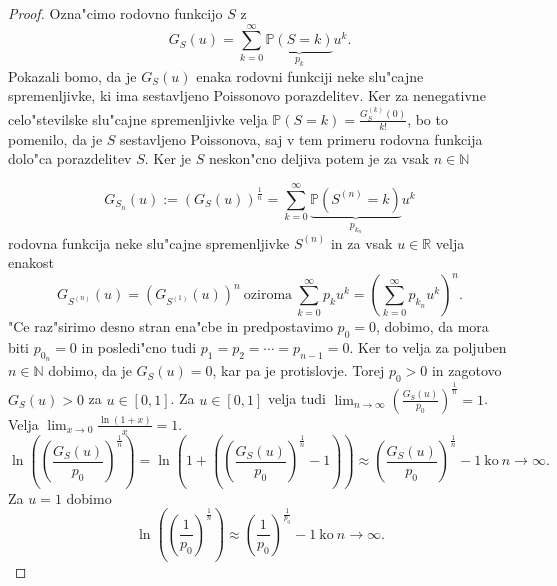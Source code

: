 \documentclass[12pt, a4paper, reqno]{amsart}
\theoremstyle{definition}
\theoremstyle{plain}
\newcommand{\R}{\mathbb{R}}
\newcommand{\N}{\mathbb{N}}
\newcommand{\Prob}{\mathbb{P}}
\newcommand{\1}{\mathds{1}}
\begin{document}
    \begin{proof}
        Ozna"cimo rodovno funkcijo $S$ z 
        \begin{equation*}
            G_S(u) = \sum_{k = 0}^\infty \underbrace{\Prob\left(S = k\right)}_{p_k}u^k.
        \end{equation*} 
        Pokazali bomo, da je $G_S(u)$ enaka rodovni funkciji neke slu"cajne spremenljivke, ki ima sestavljeno
        Poissonovo porazdelitev. Ker za nenegativne celo"stevilske slu"cajne spremenljivke velja 
        $\Prob\left(S = k\right) = \frac{G_S^{(k)}(0)}{k!}$, bo to pomenilo, da je $S$ sestavljeno Poissonova, 
        saj v tem primeru rodovna funkcija dolo"ca porazdelitev $S$.
        Ker je $S$ neskon"cno deljiva potem je za vsak $n\in\N$ 

        \begin{equation*}
            G_{S_n}(u) := \left(G_S(u)\right)^{\frac{1}{n}} = 
            \sum_{k = 0}^\infty\underbrace{\Prob\left(S^{(n)} = k\right)}_{p_{k_n}}u^k
        \end{equation*}
        rodovna funkcija neke slu"cajne spremenljivke $S^{(n)}$ in za vsak $u\in\R$ velja enakost
        \begin{equation*}
            G_{S^{(n)}}(u) = \left(G_{S^{(1)}}(u)\right)^n \ \text{oziroma} \ 
            \sum_{k = 0}^\infty p_{k}u^k = \left(\sum_{k = 0}^\infty p_{k_n}u^k\right)^n.
        \end{equation*}
        "Ce raz"sirimo desno stran ena"cbe in predpostavimo $p_0 = 0$, dobimo, da mora biti 
        $p_{0_n} = 0$ in posledi"cno tudi $p_1 = p_2 = \cdots = p_{n-1} = 0$. Ker to velja za poljuben 
        $n\in\N$ dobimo, da je $G_S(u) = 0$, kar pa je protislovje. Torej $p_0 > 0$ in zagotovo 
        $G_S(u) > 0$ za $u\in[0, 1]$. Za $u\in[0, 1]$ velja tudi $\lim_{n\to\infty}\left(\frac{G_S(u)}{p_0}\right)^{\frac{1}{n}} = 1$.
        Velja $\lim_{x \to 0}\frac{\ln(1 + x)}{x} = 1.$
        \begin{equation*}
            \ln\left(\left(\frac{G_S(u)}{p_0}\right)^{\frac{1}{n}}\right) = \ln\left( 1 + \left(\left(\frac{G_S(u)}{p_0}\right)^{\frac{1}{n}} - 1\right)\right)
            \approx \left(\frac{G_S(u)}{p_0}\right)^{\frac{1}{n}} - 1 \ \text{ko} \ n\to\infty.
        \end{equation*}
        Za $u = 1$ dobimo
        \begin{equation*}
            \ln\left(\left(\frac{1}{p_0}\right)^{\frac{1}{n}}\right) \approx \left(\frac{1}{p_0}\right)^{\frac{1}{p_0}} - 1 \ \text{ko} \ n\to\infty.
        \end{equation*}



        

    \end{proof}
\end{document}
